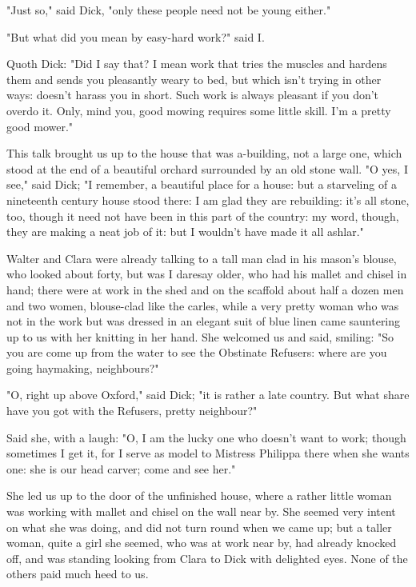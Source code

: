"Just so," said Dick, "only these people need not be young either."

"But what did you mean by easy-hard work?" said I.

Quoth Dick: "Did I say that? I mean work that tries the muscles and
hardens them and sends you pleasantly weary to bed, but which isn't
trying in other ways: doesn't harass you in short. Such work is always
pleasant if you don't overdo it. Only, mind you, good mowing requires
some little skill. I'm a pretty good mower."

This talk brought us up to the house that was a-building, not a large
one, which stood at the end of a beautiful orchard surrounded by an old
stone wall. "O yes, I see," said Dick; "I remember, a beautiful place
for a house: but a starveling of a nineteenth century house stood there:
I am glad they are rebuilding: it's all stone, too, though it need not
have been in this part of the country: my word, though, they are making
a neat job of it: but I wouldn't have made it all ashlar."

Walter and Clara were already talking to a tall man clad in his mason's
blouse, who looked about forty, but was I daresay older, who had his
mallet and chisel in hand; there were at work in the shed and on the
scaffold about half a dozen men and two women, blouse-clad like the
carles, while a very pretty woman who was not in the work but was
dressed in an elegant suit of blue linen came sauntering up to us with
her knitting in her hand. She welcomed us and said, smiling: "So you are
come up from the water to see the Obstinate Refusers: where are you
going haymaking, neighbours?"

"O, right up above Oxford," said Dick; "it is rather a late country. But
what share have you got with the Refusers, pretty neighbour?"

Said she, with a laugh: "O, I am the lucky one who doesn't want to work;
though sometimes I get it, for I serve as model to Mistress Philippa
there when she wants one: she is our head carver; come and see her."

She led us up to the door of the unfinished house, where a rather little
woman was working with mallet and chisel on the wall near by. She seemed
very intent on what she was doing, and did not turn round when we came
up; but a taller woman, quite a girl she seemed, who was at work near
by, had already knocked off, and was standing looking from Clara to Dick
with delighted eyes. None of the others paid much heed to us.

